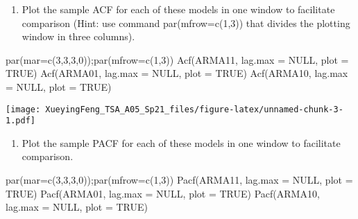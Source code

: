 \documentclass[
]{article}
\newenvironment{Shaded}{\begin{snugshade}}{\end{snugshade}}
\newcommand{\AttributeTok}[1]{\textcolor[rgb]{0.77,0.63,0.00}{#1}}
\newcommand{\ConstantTok}[1]{\textcolor[rgb]{0.00,0.00,0.00}{#1}}
\newcommand{\DecValTok}[1]{\textcolor[rgb]{0.00,0.00,0.81}{#1}}
\newcommand{\FunctionTok}[1]{\textcolor[rgb]{0.00,0.00,0.00}{#1}}
\newcommand{\NormalTok}[1]{#1}
\providecommand{\tightlist}{%
  \setlength{\itemsep}{0pt}\setlength{\parskip}{0pt}}
\begin{document}
\begin{enumerate}
\def\labelenumi{(\alph{enumi})}
\tightlist
\item
  Plot the sample ACF for each of these models in one window to
  facilitate comparison (Hint: use command par(mfrow=c(1,3)) that
  divides the plotting window in three columns).
\end{enumerate}

\begin{Shaded}
\begin{Highlighting}[]
\FunctionTok{par}\NormalTok{(}\AttributeTok{mar=}\FunctionTok{c}\NormalTok{(}\DecValTok{3}\NormalTok{,}\DecValTok{3}\NormalTok{,}\DecValTok{3}\NormalTok{,}\DecValTok{0}\NormalTok{));}\FunctionTok{par}\NormalTok{(}\AttributeTok{mfrow=}\FunctionTok{c}\NormalTok{(}\DecValTok{1}\NormalTok{,}\DecValTok{3}\NormalTok{))}
\FunctionTok{Acf}\NormalTok{(ARMA11, }\AttributeTok{lag.max =} \ConstantTok{NULL}\NormalTok{, }\AttributeTok{plot =} \ConstantTok{TRUE}\NormalTok{)}
\FunctionTok{Acf}\NormalTok{(ARMA01, }\AttributeTok{lag.max =} \ConstantTok{NULL}\NormalTok{, }\AttributeTok{plot =} \ConstantTok{TRUE}\NormalTok{)}
\FunctionTok{Acf}\NormalTok{(ARMA10, }\AttributeTok{lag.max =} \ConstantTok{NULL}\NormalTok{, }\AttributeTok{plot =} \ConstantTok{TRUE}\NormalTok{)}
\end{Highlighting}
\end{Shaded}

\texttt{[image: XueyingFeng\_TSA\_A05\_Sp21\_files/figure-latex/unnamed-chunk-3-1.pdf]}

\begin{enumerate}
\def\labelenumi{(\alph{enumi})}
\setcounter{enumi}{1}
\tightlist
\item
  Plot the sample PACF for each of these models in one window to
  facilitate comparison.
\end{enumerate}

\begin{Shaded}
\begin{Highlighting}[]
\FunctionTok{par}\NormalTok{(}\AttributeTok{mar=}\FunctionTok{c}\NormalTok{(}\DecValTok{3}\NormalTok{,}\DecValTok{3}\NormalTok{,}\DecValTok{3}\NormalTok{,}\DecValTok{0}\NormalTok{));}\FunctionTok{par}\NormalTok{(}\AttributeTok{mfrow=}\FunctionTok{c}\NormalTok{(}\DecValTok{1}\NormalTok{,}\DecValTok{3}\NormalTok{))}
\FunctionTok{Pacf}\NormalTok{(ARMA11, }\AttributeTok{lag.max =} \ConstantTok{NULL}\NormalTok{, }\AttributeTok{plot =} \ConstantTok{TRUE}\NormalTok{)}
\FunctionTok{Pacf}\NormalTok{(ARMA01, }\AttributeTok{lag.max =} \ConstantTok{NULL}\NormalTok{, }\AttributeTok{plot =} \ConstantTok{TRUE}\NormalTok{)}
\FunctionTok{Pacf}\NormalTok{(ARMA10, }\AttributeTok{lag.max =} \ConstantTok{NULL}\NormalTok{, }\AttributeTok{plot =} \ConstantTok{TRUE}\NormalTok{)}
\end{Highlighting}
\end{Shaded}
\end{document}
